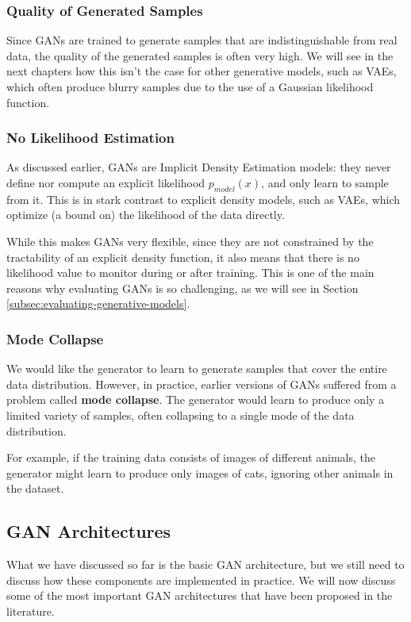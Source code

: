 \subsubsection{Quality of Generated Samples}
Since GANs are trained to generate samples that are indistinguishable from real data, the quality of the generated samples is often very high.
We will see in the next chapters how this isn't the case for other generative models, such as VAEs, which often produce blurry samples due to the use of a Gaussian likelihood function.

\subsubsection{No Likelihood Estimation}
As discussed earlier, GANs are Implicit Density Estimation models: they never define nor compute an explicit likelihood $p_{model}(x)$, and only learn to sample from it.
This is in stark contrast to explicit density models, such as VAEs, which optimize (a bound on) the likelihood of the data directly.

While this makes GANs very flexible, since they are not constrained by the tractability of an explicit density function, it also means that there is no likelihood value to monitor during or after training.
This is one of the main reasons why evaluating GANs is so challenging, as we will see in Section \ref{subsec:evaluating-generative-models}.

\subsubsection{Mode Collapse}
We would like the generator to learn to generate samples that cover the entire data distribution. However, in practice, earlier versions of GANs
suffered from a problem called \textbf{mode collapse}. The generator would learn to produce only a limited variety of samples, often collapsing to a single mode of the data distribution.

For example, if the training data consists of images of different animals, the generator might learn to produce only images of cats, ignoring other animals in the dataset.

\subsection{GAN Architectures}
What we have discussed so far is the basic GAN architecture, but we still need to discuss how these components are implemented in practice.
We will now discuss some of the most important GAN architectures that have been proposed in the literature.

